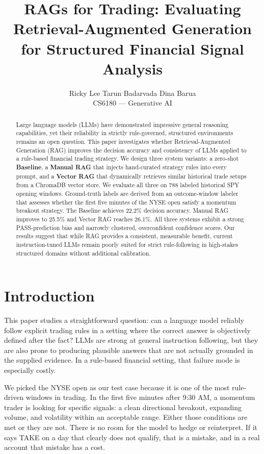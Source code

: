 \documentclass{article}
\title{RAGs for Trading: Evaluating Retrieval-Augmented Generation\\
for Structured Financial Signal Analysis}
\author{%
  Ricky Lee \And
  Tarun Badarvada \And
  Dina Barua \\
  CS6180 --- Generative AI
}
\begin{document}
\maketitle

\begin{abstract}
Large language models (LLMs) have demonstrated impressive general reasoning capabilities, yet their reliability in strictly rule-governed, structured environments remains an open question. This paper investigates whether Retrieval-Augmented Generation (RAG) improves the decision accuracy and consistency of LLMs applied to a rule-based financial trading strategy. We design three system variants: a zero-shot \textbf{Baseline}, a \textbf{Manual RAG} that injects hand-curated strategy rules into every prompt, and a \textbf{Vector RAG} that dynamically retrieves similar historical trade setups from a ChromaDB vector store. We evaluate all three on 788 labeled historical SPY opening windows. Ground-truth labels are derived from an outcome-window labeler that assesses whether the first five minutes of the NYSE open satisfy a momentum breakout strategy. The Baseline achieves 22.2\% decision accuracy. Manual RAG improves to 25.5\% and Vector RAG reaches 26.1\%. All three systems exhibit a strong PASS-prediction bias and narrowly clustered, overconfident confidence scores. Our results suggest that while RAG provides a consistent, measurable benefit, current instruction-tuned LLMs remain poorly suited for strict rule-following in high-stakes structured domains without additional calibration.
\end{abstract}

\section{Introduction}

This paper studies a straightforward question: can a language model reliably follow explicit trading rules in a setting where the correct answer is objectively defined after the fact? LLMs are strong at general instruction following, but they are also prone to producing plausible answers that are not actually grounded in the supplied evidence. In a rule-based financial setting, that failure mode is especially costly.

We picked the NYSE open as our test case because it is one of the most rule-driven windows in trading. In the first five minutes after 9:30 AM, a momentum trader is looking for specific signals: a clean directional breakout, expanding volume, and volatility within an acceptable range. Either those conditions are met or they are not. There is no room for the model to hedge or reinterpret. If it says TAKE on a day that clearly does not qualify, that is a mistake, and in a real account that mistake has a cost.
\end{document}
